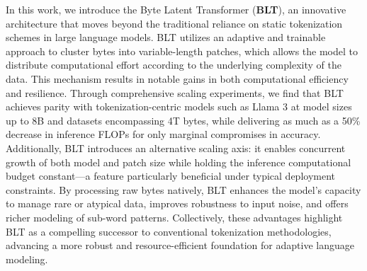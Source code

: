In this work, we introduce the Byte Latent Transformer (\textbf{BLT}), an innovative architecture that moves beyond the traditional reliance on static tokenization schemes in large language models. {\textsc BLT} utilizes an adaptive and trainable approach to cluster bytes into variable-length patches, which allows the model to distribute computational effort according to the underlying complexity of the data. This mechanism results in notable gains in both computational efficiency and resilience. Through comprehensive scaling experiments, we find that {\textsc BLT} achieves parity with tokenization-centric models such as Llama 3 at model sizes up to 8B and datasets encompassing 4T bytes, while delivering as much as a 50\% decrease in inference FLOPs for only marginal compromises in accuracy. Additionally, {\textsc BLT} introduces an alternative scaling axis: it enables concurrent growth of both model and patch size while holding the inference computational budget constant—a feature particularly beneficial under typical deployment constraints. By processing raw bytes natively, {\textsc BLT} enhances the model’s capacity to manage rare or atypical data, improves robustness to input noise, and offers richer modeling of sub-word patterns. Collectively, these advantages highlight {\textsc BLT} as a compelling successor to conventional tokenization methodologies, advancing a more robust and resource-efficient foundation for adaptive language modeling.

